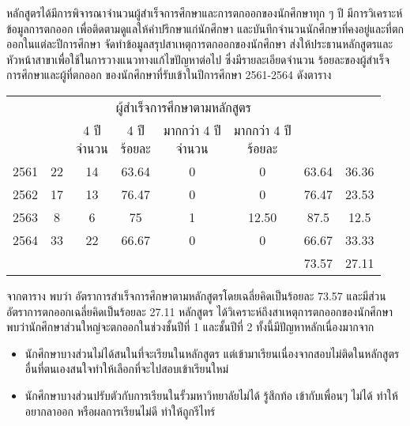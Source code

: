 \newpage
{}

หลักสูตรได้มีการพิจารณาจำนวนผู้สำเร็จการศึกษาและการตกออกของนักศึกษาทุก ๆ ปี มีการวิเคราะห์ข้อมูลการตกออก เพื่อติดตามดูแลให้คำปรึกษาแก่นักศึกษา และบันทึกจำนวนนักศึกษาที่คงอยู่และที่ตกออกในแต่ละปีการศึกษา จัดทำข้อมูลสรุปสาเหตุการตกออกของนักศึกษา ส่งให้ประธานหลักสูตรและหัวหน้าสาขาเพื่อใช้ในการวางแนวทางแก้ไขปัญหาต่อไป 
ซึ่งมีรายละเอียดจำนวน ร้อยละของผู้สำเร็จการศึกษาและผู้ที่ตกออก ของนักศึกษาที่รับเข้าในปีการศึกษา 2561-2564 ดังตาราง\\[0.2cm]
  {\footnotesize
 	\begin{tabular}{|c|c|c|c|c|c|c|c|}
 		\hline
 		{\multirow{2}{0.11\textwidth}{ปีการศึกษา}} & {\multirow{2}{0.12\textwidth}{จำนวนรับเข้า\newline  \hspace*{0.2cm}(มีตัวตน)}} & \multicolumn{4}{c|}{ผู้สำเร็จการศึกษาตามหลักสูตร} & \multirow{2}{0.1\textwidth}{\centering{ร้อยละของผู้สำเร็จการศึกษาตามหลักสูตร}} & \multirow{2}{0.11\textwidth}{\centering{ร้อยละของ\newline ผู้ที่ตกออก}} \\
 		\cline{3-6}          &      &\multicolumn{1}{p{0.05\textwidth}|}{{ 4 ปี\newline จำนวน}}  & \multicolumn{1}{p{0.058\textwidth}|}{{ 4 ปี\newline ร้อยละ}}  & \multicolumn{1}{p{0.105\textwidth}|}{{มากกว่า 4 ปี\newline จำนวน}}     &\multicolumn{1}{p{0.105\textwidth}|}{{มากกว่า 4 ปี\newline ร้อยละ}}&      & \\\hline
 		2561     & 22    &  14  & 63.64&0 &  0  & 63.64   & 36.36   \\  \hline
 		2562     & 17    &  13  & 76.47 &0&  0 & 76.47   & 23.53  \\   \hline
 		2563     & 8     &  6   &  75  & 1 & 12.50 & 87.5   &  12.5  \\   \hline
 		2564& 33     &  22   & 66.67   &   0&  0  & 66.67   &  33.33  \\  \hline
 	\multicolumn{6}{|c|}{}&	73.57   &  27.11 \\\hline
 	\end{tabular}   
 }
 

 จากตาราง พบว่า อัตราการสำเร็จการศึกษาตามหลักสูตรโดยเฉลี่ยคิดเป็นร้อยละ 73.57 และมีส่วนอัตราการตกออกเฉลี่ยคิดเป็นร้อยละ 27.11 หลักสูตร ได้วิเคราะห์ถึงสาเหตุการตกออกของนักศึกษา พบว่านักศึกษาส่วนใหญ่จะตกออกในช่วงชั้นปีที่ 1 และชั้นปีที่ 2 ทั้งนี้มีปัญหาหลักเนื่องมากจาก 
 \begin{itemize}
 	\item นักศึกษาบางส่วนไม่ได้สนในที่จะเรียนในหลักสูตร แต่เข้ามาเรียนเนื่องจากสอบไม่ติดในหลักสูตรอื่นที่ตนเองสนใจทำให้เลือกที่จะไปสอบเข้าเรียนใหม่
 	\item นักศึกษาบางส่วนปรับตัวกับการเรียนในรั้วมหาวิทยาลัยไม่ได้ รู้สึกท้อ เข้ากับเพื่อนๆ ไม่ได้ ทำให้อยากลาออก หรือผลการเรียนไม่ดี ทำให้ถูกรีไทร์
 \end{itemize}
  
